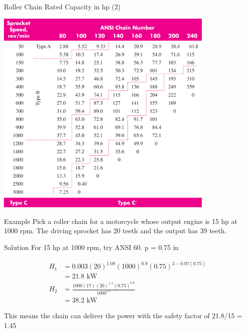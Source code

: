 \documentclass[10pt, svgnames]{beamer}
\begin{document}
\begin{frame}[label={sec:orgb63fbc6}]{Roller Chain Rated Capacity in hp (2)}
\begin{center}
\includegraphics[width=0.8\textwidth]{./pictures/chain-rated-capacity2.png}
\end{center}
\end{frame}

\begin{frame}[label={sec:org8d3ca2f}]{Example}
Pick a roller chain for a motorcycle whose output engine is 15 hp at 1000 rpm. The driving sprocket has 20 teeth and the output has 39 teeth.
\end{frame}

\begin{frame}[label={sec:org753c2e6}]{Solution}
For 15 hp at 1000 rpm, try ANSI 60. p = 0.75 in

\begin{align*}
    H_1 &= 0.003(20)^{1.08}(1000)^{0.9}(0.75)^{3-0.07(0.75)} \\
        &= 21.8 \text{ kW} \\
    H_2 &= \frac{1000(17)(20)^{1.5}(0.75)^{0.8}}{1000^{1.5}} \\
        &= 38.2 \text{ kW}
\end{align*}

This means the chain can deliver the power with the safety factor of 21.8/15 = 1.45
\end{frame}
\end{document}
